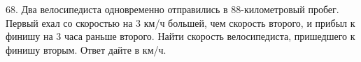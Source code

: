 68. Два велосипедиста одновременно отправились в 88-километровый пробег. Первый ехал со скоростью на 3 км/ч большей, чем скорость второго, и прибыл к финишу на 3 часа раньше второго. Найти скорость велосипедиста, пришедшего к финишу вторым. Ответ дайте в км/ч.\\
